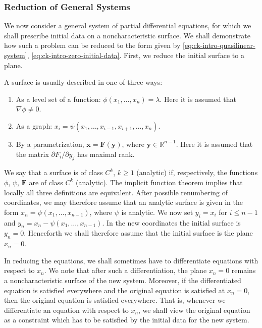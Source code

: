 \subsubsection{Reduction of General Systems}\label{subsec:general-system-reduction}

We now consider a general system of partial differential equations, for which we shall prescribe initial data on a noncharacteristic surface. We shall demonstrate how such a problem can be reduced to the form given by \eqref{eq:ck-intro-quasilinear-system}, \eqref{eq:ck-intro-zero-initial-data}. First, we reduce the initial surface to a plane.

A surface is usually described in one of three ways:
\begin{enumerate}
\item As a level set of a function: $\phi(x_1,\ldots,x_n)=\lambda$. Here it is assumed that $\nabla\phi\ne0$.
\item As a graph: $x_i=\psi(x_1,\ldots,x_{i-1},x_{i+1},\ldots,x_n)$.
\item By a parametrization, $\bm{x}=\bm{F}(\bm{y})$, where $\bm{y}\in\mathbb{R}^{n-1}$. Here it is assumed that the matrix $\partial F_i/\partial y_j$ has maximal rank.
\end{enumerate}

We say that a surface is of class $C^k$, $k\geq1$ (analytic) if, respectively, the functions $\phi$, $\psi$, $\bm{F}$ are of class $C^k$ (analytic). The implicit function theorem implies that locally all three definitions are equivalent. After possible renumbering of coordinates, we may therefore assume that an analytic surface is given in the form $x_n=\psi(x_1,\ldots,x_{n-1})$, where $\psi$ is analytic. We now set $y_i=x_i$ for $i\leq n-1$ and $y_n=x_n-\psi(x_1,\ldots,x_{n-1})$. In the new coordinates the initial surface is $y_n=0$. Henceforth we shall therefore assume that the initial surface is the plane $x_n=0$.

In reducing the equations, we shall sometimes have to differentiate equations with respect to $x_n$. We note that after such a differentiation, the plane $x_n=0$ remains a noncharacteristic surface of the new system. Moreover, if the differentiated equation is satisfied everywhere and the original equation is satisfied at $x_n=0$, then the original equation is satisfied everywhere. That is, whenever we differentiate an equation with respect to $x_n$, we shall view the original equation as a constraint which has to be satisfied by the initial data for the new system.


